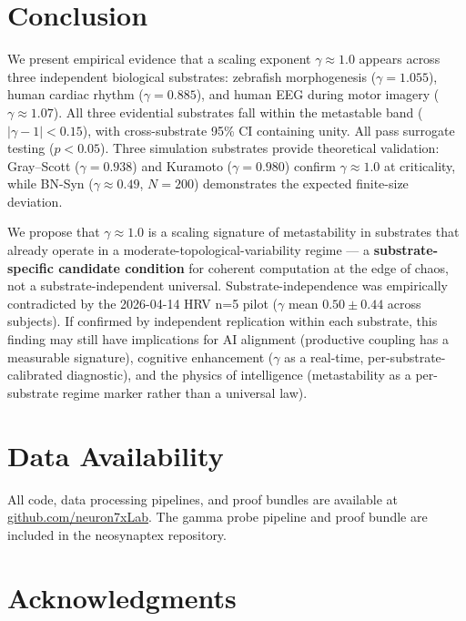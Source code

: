 \documentclass[11pt,a4paper,twocolumn]{article}
\begin{document}
\section{Conclusion}

We present empirical evidence that a scaling exponent $\gamma \approx 1.0$ appears across three independent biological substrates: zebrafish morphogenesis ($\gamma = 1.055$), human cardiac rhythm ($\gamma = 0.885$), and human EEG during motor imagery ($\gamma \approx 1.07$). All three evidential substrates fall within the metastable band ($|\gamma - 1| < 0.15$), with cross-substrate 95\% CI containing unity. All pass surrogate testing ($p < 0.05$). Three simulation substrates provide theoretical validation: Gray--Scott ($\gamma = 0.938$) and Kuramoto ($\gamma = 0.980$) confirm $\gamma \approx 1.0$ at criticality, while BN-Syn ($\gamma \approx 0.49$, $N\!=\!200$) demonstrates the expected finite-size deviation.

We propose that $\gamma \approx 1.0$ is a scaling signature of metastability in substrates that already operate in a moderate-topological-variability regime --- a \textbf{substrate-specific candidate condition} for coherent computation at the edge of chaos, not a substrate-independent universal. Substrate-independence was empirically contradicted by the 2026-04-14 HRV n=5 pilot ($\gamma$ mean $0.50 \pm 0.44$ across subjects). If confirmed by independent replication within each substrate, this finding may still have implications for AI alignment (productive coupling has a measurable signature), cognitive enhancement ($\gamma$ as a real-time, per-substrate-calibrated diagnostic), and the physics of intelligence (metastability as a per-substrate regime marker rather than a universal law).

\section*{Data Availability}

All code, data processing pipelines, and proof bundles are available at \url{github.com/neuron7xLab}. The gamma probe pipeline and proof bundle are included in the neosynaptex repository.

\section*{Acknowledgments}
\end{document}
